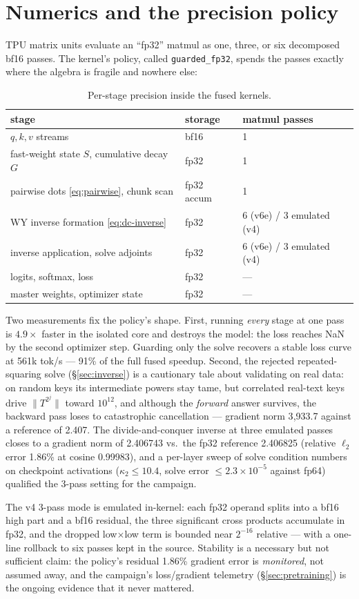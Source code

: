 \section{Numerics and the precision policy}
\label{sec:numerics}

TPU matrix units evaluate an ``fp32'' matmul as one, three, or six
decomposed bf16 passes. The kernel's policy, called
\texttt{guarded\_fp32}, spends the passes exactly where the algebra is
fragile and nowhere else:

\begin{table}[h]
\centering
\small
\caption{Per-stage precision inside the fused kernels.}
\label{tab:precision}
\begin{tabular}{lll}
\toprule
stage & storage & matmul passes \\
\midrule
$q, k, v$ streams & bf16 & 1 \\
fast-weight state $S$, cumulative decay $G$ & fp32 & 1 \\
pairwise dots \eqref{eq:pairwise}, chunk scan & fp32 accum & 1 \\
WY inverse formation \eqref{eq:dc-inverse} & fp32 & 6 (v6e) / 3 emulated (v4) \\
inverse application, solve adjoints & fp32 & 6 (v6e) / 3 emulated (v4) \\
logits, softmax, loss & fp32 & --- \\
master weights, optimizer state & fp32 & --- \\
\bottomrule
\end{tabular}
\end{table}

Two measurements fix the policy's shape. First, running \emph{every}
stage at one pass is $4.9\times$ faster in the isolated core and
destroys the model: the loss reaches NaN by the second optimizer step.
Guarding only the solve recovers a stable loss curve at 561k tok/s ---
91\% of the full fused speedup. Second, the rejected repeated-squaring
solve (\S\ref{sec:inverse}) is a cautionary tale about validating on
real data: on random keys its intermediate powers stay tame, but
correlated real-text keys drive $\lVert T^{2^j} \rVert$ toward
$10^{12}$, and although the \emph{forward} answer survives, the backward
pass loses to catastrophic cancellation --- gradient norm 3{,}933.7
against a reference of 2.407. The divide-and-conquer inverse at three
emulated passes closes to a gradient norm of 2.406743 vs.\ the fp32
reference 2.406825 (relative $\ell_2$ error 1.86\% at cosine 0.99983),
and a per-layer sweep of solve condition numbers on checkpoint
activations ($\kappa_2 \le 10.4$, solve error $\le 2.3\times10^{-5}$
against fp64) qualified the 3-pass setting for the campaign.

The v4 3-pass mode is emulated in-kernel: each fp32 operand splits into
a bf16 high part and a bf16 residual, the three significant cross
products accumulate in fp32, and the dropped low$\times$low term is
bounded near $2^{-16}$ relative --- with a one-line rollback to six
passes kept in the source. Stability is a necessary but not sufficient
claim: the policy's residual 1.86\% gradient error is \emph{monitored},
not assumed away, and the campaign's loss/gradient telemetry
(\S\ref{sec:pretraining}) is the ongoing evidence that it never mattered.
